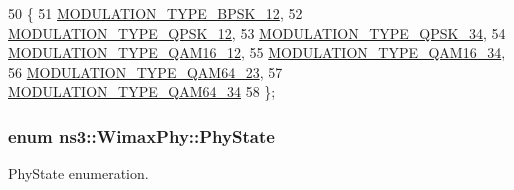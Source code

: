 \begin{DoxyCode}
50   \{
51     \hyperlink{classns3_1_1WimaxPhy_a044c5d8a48ca992c39c2a946f6e755faaef0b78541d9b66d4e85780131e665028}{MODULATION\_TYPE\_BPSK\_12},
52     \hyperlink{classns3_1_1WimaxPhy_a044c5d8a48ca992c39c2a946f6e755faa21f9f78031cd1105c0ff97c9df57de1d}{MODULATION\_TYPE\_QPSK\_12},
53     \hyperlink{classns3_1_1WimaxPhy_a044c5d8a48ca992c39c2a946f6e755faaed15df1f1feb034c0f69dc5e44d05834}{MODULATION\_TYPE\_QPSK\_34},
54     \hyperlink{classns3_1_1WimaxPhy_a044c5d8a48ca992c39c2a946f6e755faa3b72d83f9fc0c4f964a939a0aa2df5af}{MODULATION\_TYPE\_QAM16\_12},
55     \hyperlink{classns3_1_1WimaxPhy_a044c5d8a48ca992c39c2a946f6e755faa821f09b9921774eb6875b7ec4686ab58}{MODULATION\_TYPE\_QAM16\_34},
56     \hyperlink{classns3_1_1WimaxPhy_a044c5d8a48ca992c39c2a946f6e755faadc970aa3e5c6c6774cc30daf2c9e176f}{MODULATION\_TYPE\_QAM64\_23},
57     \hyperlink{classns3_1_1WimaxPhy_a044c5d8a48ca992c39c2a946f6e755faa6d659f22bcedc066aa831271b75734a9}{MODULATION\_TYPE\_QAM64\_34}
58   \};
\end{DoxyCode}
\subsubsection[{\texorpdfstring{Phy\+State}{PhyState}}]{\setlength{\rightskip}{0pt plus 5cm}enum {\bf ns3\+::\+Wimax\+Phy\+::\+Phy\+State}}\hypertarget{classns3_1_1WimaxPhy_a9cc75c9e84f88fc3064bba918eee1f78}{}\label{classns3_1_1WimaxPhy_a9cc75c9e84f88fc3064bba918eee1f78}


Phy\+State enumeration. 

